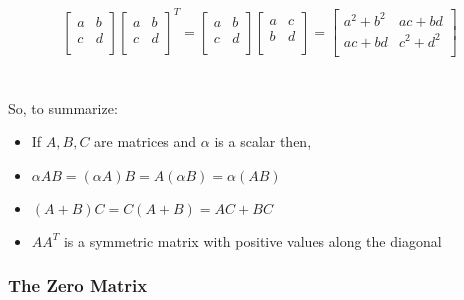 \documentclass[../MathsNotesBase.tex]{subfiles}
\begin{document}
{		\begin{align*}
			\begin{bmatrix}
			a & b \\
			c & d \\
			\end{bmatrix}
			\begin{bmatrix}
			a & b \\
			c & d \\
			\end{bmatrix}^{T}
			=
			\begin{bmatrix}
			a & b \\
			c & d \\
			\end{bmatrix}
			\begin{bmatrix}
			a & c \\
			b & d \\
			\end{bmatrix}
			=
			\begin{bmatrix}
			a^{2} + b^{2} & ac + bd \\
			ac + bd & c^{2} + d^{2} \\
			\end{bmatrix}		
		\end{align*}
		\\\\
		So, to summarize:
		\begin{itemize}
		\item[]{If $A,B,C$ are matrices and $\alpha$ is a scalar then,}
		\item{$\alpha AB = (\alpha A)B = A(\alpha B) = \alpha(AB)$}
		\item{$(A + B)C = C(A + B) = AC + BC$}
		\item{$AA^{T}$ is a symmetric matrix with positive values along the diagonal}
		\end{itemize}
	
		\bigskip
		\subsubsection{The Zero Matrix}
	
}
\end{document}
